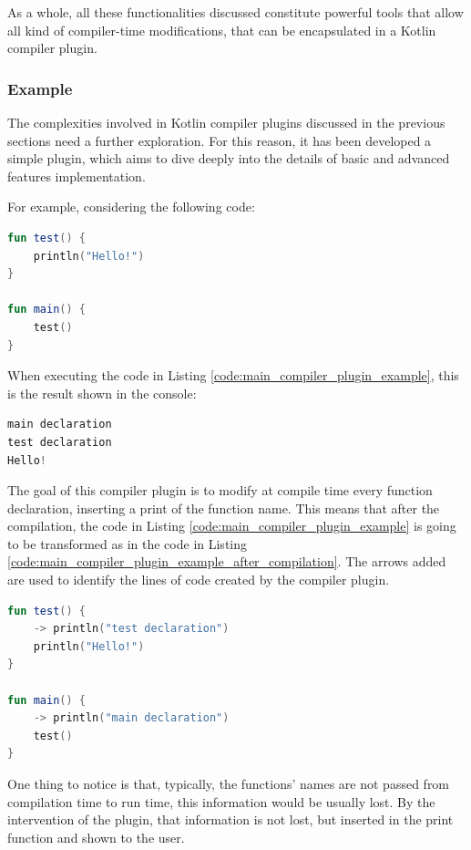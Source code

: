 As a whole, all these functionalities discussed constitute powerful tools that allow all kind of compiler-time modifications, that can be encapsulated in a Kotlin compiler plugin.

\subsubsection{Example}\label{section:compiler_plugin_example}
The complexities involved in Kotlin compiler plugins discussed in the previous sections need a further exploration. For this reason, it has been developed a simple plugin, which aims to dive deeply into the details of basic and advanced features implementation.

For example, considering the following code:
\begin{lstlisting}[caption={Kotlin code without the modification of the compiler plugin created as an example}, captionpos=b, language=Kotlin, label={code:main_compiler_plugin_example}]
fun test() {
    println("Hello!")
}
    
fun main() {
    test()
}
\end{lstlisting}
When executing the code in Listing \ref{code:main_compiler_plugin_example}, this is the result shown in the console:
\begin{lstlisting}[caption={Output of the execution of Listing \ref{code:main_compiler_plugin_example} with the application of the compiler plugin created as an example}, captionpos=b, language=Kotlin, label={code:output_main_compiler_plugin_example}]
main declaration
test declaration
Hello!
\end{lstlisting}
The goal of this compiler plugin is to modify at compile time every function declaration, inserting a print of the function name. This means that after the compilation, the code in Listing \ref{code:main_compiler_plugin_example} is going to be transformed as in the code in Listing \ref{code:main_compiler_plugin_example_after_compilation}. The arrows added are used to identify the lines of code created by the compiler plugin.
\begin{lstlisting}[caption={Kotlin code with the modification of the compiler plugin created as an example}, captionpos=b, language=Kotlin, escapechar=\$, label={code:main_compiler_plugin_example_after_compilation}]
fun test() {
    -> println("test declaration")
    println("Hello!")
}

fun main() {
    -> println("main declaration")
    test()
}
\end{lstlisting}
One thing to notice is that, typically, the functions' names are not passed from compilation time to run time, this information would be usually lost. By the intervention of the plugin, that information is not lost, but inserted in the print function and shown to the user.

